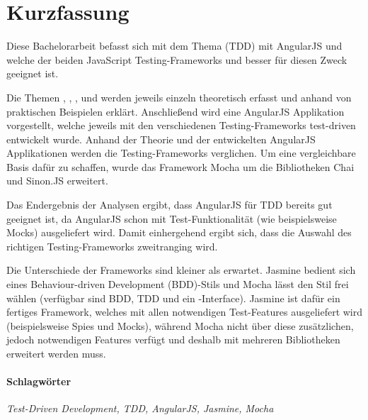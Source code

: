 \section*{Kurzfassung}
\vspace{0.5cm}

Diese Bachelorarbeit befasst sich mit dem Thema  (TDD) mit AngularJS und welche der beiden JavaScript Testing-Frameworks  und  besser für diesen Zweck geeignet ist.

Die Themen , , ,  und  werden jeweils einzeln theoretisch erfasst und anhand von praktischen Beispielen erklärt. Anschließend wird eine AngularJS Applikation vorgestellt, welche jeweils mit den verschiedenen Testing-Frameworks test-driven entwickelt wurde. Anhand der Theorie und der entwickelten AngularJS Applikationen werden die Testing-Frameworks verglichen. Um eine vergleichbare Basis dafür zu schaffen, wurde das Framework Mocha um die Bibliotheken Chai und Sinon.JS erweitert.

Das Endergebnis der Analysen ergibt, dass AngularJS für TDD bereits gut geeignet ist, da AngularJS schon mit Test-Funktionalität (wie beispielsweise Mocks) ausgeliefert wird. Damit einhergehend ergibt sich, dass die Auswahl des richtigen Testing-Frameworks zweitranging wird.

Die Unterschiede der Frameworks sind kleiner als erwartet. Jasmine bedient sich eines Behaviour-driven Development (BDD)-Stils und Mocha lässt den Stil frei wählen (verfügbar sind BDD, TDD und ein -Interface). Jasmine ist dafür ein fertiges Framework, welches mit allen notwendigen Test-Features ausgeliefert wird (beispielsweise Spies und Mocks), während Mocha nicht über diese zusätzlichen, jedoch notwendigen Features verfügt und deshalb mit mehreren Bibliotheken erweitert werden muss.

\paragraph{Schlagwörter}
\textit{Test-Driven Development, TDD, AngularJS, Jasmine, Mocha}

